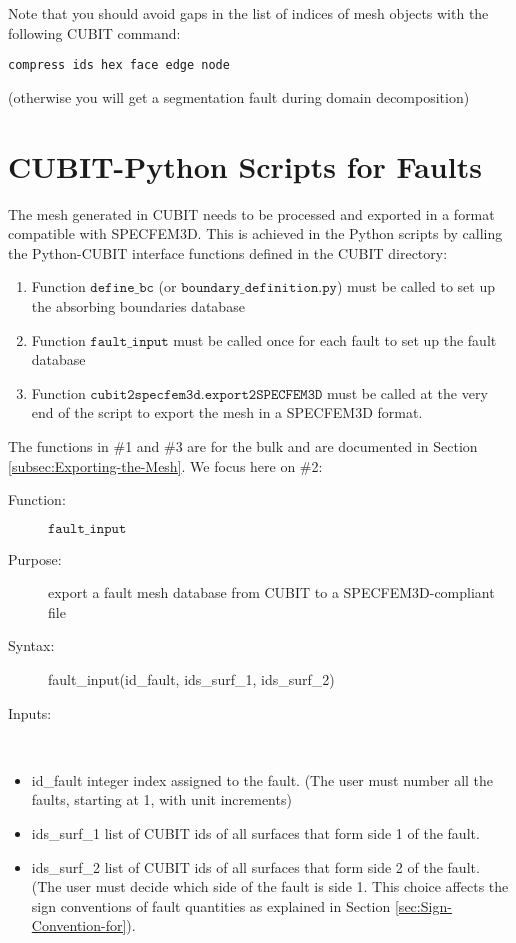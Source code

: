 \newpage
\noindent
Note that you should avoid gaps in the list of indices of mesh objects
with the following CUBIT command:

{\footnotesize
\begin{verbatim}
compress ids hex face edge node
\end{verbatim}
}
\noindent
(otherwise you will get a segmentation fault during domain decomposition)


\section{CUBIT-Python Scripts for Faults}

The mesh generated in CUBIT needs to be processed and exported in
a format compatible with SPECFEM3D. This is achieved in the Python
scripts by calling the Python-CUBIT interface functions defined in
the CUBIT directory:
\begin{enumerate}
\item Function $\mathtt{define\_bc}$ (or $\mathtt{boundary\_definition.py}$)
must be called to set up the absorbing boundaries database
\item Function $\mathtt{fault\_input}$ must be called once for each fault
to set up the fault database
\item Function $\mathtt{cubit2specfem3d.export2SPECFEM3D}$ must be called
at the very end of the script to export the mesh in a SPECFEM3D format.
\end{enumerate}
The functions in \#1 and \#3 are for the bulk and are documented in
Section \ref{subsec:Exporting-the-Mesh}. We focus here on \#2:
\begin{description}
\item [{Function:}] $\mathtt{fault\_input}$
\item [{Purpose:}] export a fault mesh database from CUBIT to a SPECFEM3D-compliant
file
\item [{Syntax:}] fault\_input(id\_fault, ids\_surf\_1, ids\_surf\_2)
\item [{Inputs:}]~\end{description}
\begin{itemize}
\item id\_fault integer index assigned to the fault. (The user must number
all the faults, starting at 1, with unit increments)
\item ids\_surf\_1 list of CUBIT ids of all surfaces that form side 1 of
the fault.
\item ids\_surf\_2 list of CUBIT ids of all surfaces that form side 2 of
the fault. (The user must decide which side of the fault is side 1.
This choice affects the sign conventions of fault quantities as explained
in Section \ref{sec:Sign-Convention-for}).\end{itemize}
